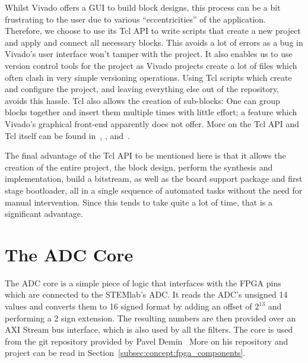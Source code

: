 Whilst Vivado offers  a GUI to build  block designs, this process can be a bit
frustrating to the user due to various ``eccentricities'' of the application.
Therefore, we choose to use its Tcl API
to write scripts that create a new project and apply and connect all necessary
blocks. This avoids a lot of errors as  a bug in Vivado's user interface won't tamper
with the project.
It  also enables  us  to use  version control tools for  the  project as  Vivado
projects  create  a  lot  of  files which  often  clash  in  very  simple
versioning operations. Using Tcl scripts which create and configure the project,
and leaving everything else out of the repository, avoids this hassle.
Tcl also allows  the creation of sub-blocks: One can group  blocks together and
insert  them multiple  times  with  little effort;  a  feature which  Vivado's
graphical front-end apparently does not offer.
More    on    the    Tcl    API     and    Tcl    itself    can    be    found
in~\cite{xilinx:vivado-tcl-command-reference-guide},
\cite{xilinx:vivado-design-suit-user-guide:using-tcl-scripting},
and~\cite{tcl-exchange}.

The final advantage of the Tcl API to  be mentioned here is that it allows the
creation of  the entire project, the  block design, perform the  synthesis and
implementation, build  a bitstream, as well  as the board support  package and
first stage  bootloader, all in a  single sequence of automated  tasks without
the need  for manual  intervention. Since this  tends to take  quite a  lot of
time, that is a significant advantage.

%
%
\section{The ADC Core} %
\label{sec:fpga:adc}

The ADC  core is a simple  piece of logic  that interfaces with the  FPGA pins
which  are  connected  to  the  STEMlab's ADC. It  reads  the  ADC's  unsigned
\SI{14}{\bit}  values and  converts  them to  \SI{16}{\bit}  signed format  by
adding an offset of $2^{13}$ and performing a \SI{2}{\bit} sign extension. The
resulting numbers are then provided over an AXI Stream bus interface, which is
also  used by  all the  filters.  The  core is  used from  the git  repository
provided by Pavel Demin~\cite{pita:github:pitaya-notes} More on his repository
and project can be read in Section~\ref{subsec:concept:fpga_components}.

